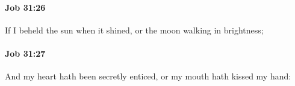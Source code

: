 		\paragraph{Job 31:26} %
			\label{JOB-31-26}

			If I beheld the sun when it shined, or the moon walking in brightness;


		\paragraph{Job 31:27} %
			\label{JOB-31-27}

			And my heart hath been secretly enticed, or my mouth hath kissed my hand:


